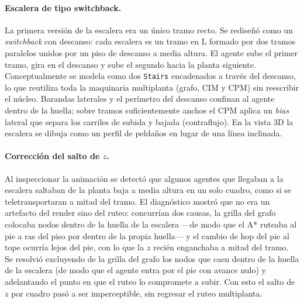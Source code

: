 \documentclass[11pt,a4paper]{article}
\begin{document}
\paragraph{Escalera de tipo switchback.}
La primera versión de la escalera era un único tramo recto. Se rediseñó como un
\emph{switchback} con descanso: cada escalera es un tramo en L formado por dos tramos paralelos
unidos por un piso de descanso a media altura. El agente sube el primer tramo, gira en el
descanso y sube el segundo hacia la planta siguiente. Conceptualmente se modela como dos
\texttt{Stairs} encadenados a través del descanso, lo que reutiliza toda la maquinaria
multiplanta (grafo, CIM y CPM) sin reescribir el núcleo. Barandas laterales y el perímetro del
descanso confinan al agente dentro de la huella; sobre tramos suficientemente anchos el CPM
aplica un \emph{bias} lateral que separa los carriles de subida y bajada (contraflujo). En la
vista 3D la escalera se dibuja como un perfil de peldaños en lugar de una línea inclinada.

\paragraph{Corrección del salto de $z$.}
Al inspeccionar la animación se detectó que algunos agentes que llegaban a la escalera saltaban
de la planta baja a media altura en un solo cuadro, como si se teletransportaran a mitad del
tramo. El diagnóstico mostró que no era un artefacto del render sino del ruteo: concurrían dos causas,
la grilla del grafo colocaba nodos dentro de la huella de la escalera ---de modo que el A*
ruteaba al pie a ras del piso por dentro de la propia huella--- y el cambio de hop del pie al tope ocurría
lejos del pie, con lo que la $z$ recién enganchaba a mitad del tramo. Se resolvió excluyendo de
la grilla del grafo los nodos que caen dentro de la huella de la escalera (de modo que el agente
entra por el pie con avance nulo) y adelantando el punto en que el ruteo lo compromete a subir.
Con esto el salto de $z$ por cuadro pasó a ser imperceptible, sin regresar el ruteo multiplanta.
\end{document}
